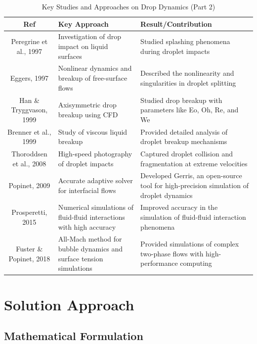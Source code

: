 \documentclass[12pt]{article}
\begin{document}
\begin{table}[htbp]
\scriptsize
\centering
\caption{Key Studies and Approaches on Drop Dynamics (Part 2)}
\renewcommand{\arraystretch}{1.2} %
\begin{tabularx}{\textwidth}{|c|X|X|}
\hline
\textbf{Ref} & \textbf{Key Approach} & \textbf{Result/Contribution} \\ \hline
Peregrine et al., 1997 \cite{peregrine1997impact} & Investigation of drop impact on liquid surfaces & Studied splashing phenomena during droplet impacts \\ \hline
Eggers, 1997 \cite{eggers1997nonlinear} & Nonlinear dynamics and breakup of free-surface flows & Described the nonlinearity and singularities in droplet splitting \\ \hline
Han \& Tryggvason, 1999 \cite{han1999axisymmetric} & Axisymmetric drop breakup using CFD & Studied drop breakup with parameters like Eo, Oh, Re, and We \\ \hline
Brenner et al., 1999 \cite{brenner1999breakup} & Study of viscous liquid breakup & Provided detailed analysis of droplet breakup mechanisms \\ \hline
Thoroddsen et al., 2008 \cite{thoroddsen2008highspeed} & High-speed photography of droplet impacts & Captured droplet collision and fragmentation at extreme velocities \\ \hline
Popinet, 2009 \cite{popinet2009accurate} & Accurate adaptive solver for interfacial flows & Developed Gerris, an open-source tool for high-precision simulation of droplet dynamics \\ \hline
Prosperetti, 2015 \cite{prosperetti2015life} & Numerical simulations of fluid-fluid interactions with high accuracy & Improved accuracy in the simulation of fluid-fluid interaction phenomena \\ \hline
Fuster \& Popinet, 2018 \cite{fuster2018allmach} & All-Mach method for bubble dynamics and surface tension simulations & Provided simulations of complex two-phase flows with high-performance computing \\ \hline
\end{tabularx}
\end{table}



\section{Solution Approach}

\subsection{Mathematical Formulation}
\end{document}
